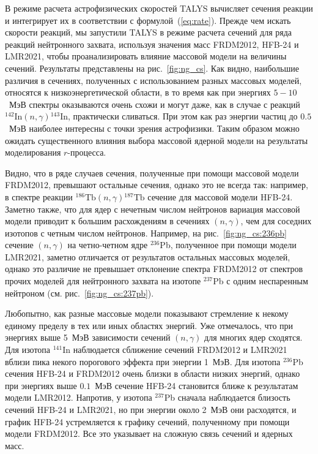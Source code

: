 В режиме расчета астрофизических скоростей TALYS вычисляет сечения реакции и интегрирует их в соответствии с формулой~(\ref{eq:rate}). Прежде чем искать скорости реакций, мы запустили TALYS в режиме расчета сечений для ряда реакций нейтронного захвата, используя значения масс FRDM2012, HFB-24 и LMR2021, чтобы проанализировать влияние массовой модели на величины сечений. Результаты представлены на рис.~\ref{fig:ng_cs}. Как видно, наибольшие различия в сечениях, полученных с использованием разных массовых моделей, относятся к низкоэнергетической области, в то время как при энергиях $5-10$~МэВ спектры оказываются очень схожи и могут даже, как в случае с реакций ${}^{142}\text{In}(n,\gamma){}^{143}\text{In}$, практически сливаться. При этом как раз энергии частиц до $0.5$~МэВ наиболее интересны с точки зрения астрофизики. Таким образом можно ожидать существенного влияния выбора массовой ядерной модели на результаты моделирования $r$-процесса.

Видно, что в ряде случаев сечения, полученные при помощи массовой модели FRDM2012, превышают остальные сечения, однако это не всегда так: например, в спектре реакции  ${}^{186}\text{Tb}(n,\gamma){}^{187}\text{Tb}$ сечение для массовой модели HFB-24. Заметно также, что для ядер с нечетным числом нейтронов вариация массовой модели приводит к большим расхождениям в сечениях $(n,\gamma)$, чем для соседних изотопов с четным числом нейтронов. Например, на рис.~\ref{fig:ng_cs:236pb} сечение $(n,\gamma)$ на четно-четном ядре ${}^{236}$Pb, полученное при помощи модели LMR2021, заметно отличается от результатов остальных массовых моделей, однако это различие не превышает отклонение спектра FRDM2012 от спектров прочих моделей для нейтронного захвата на изотопе ${}^{237}$Pb с одним неспаренным нейтроном (см. рис.~\ref{fig:ng_cs:237pb}).

Любопытно, как разные массовые модели показывают стремление к некому единому пределу в тех или иных областях энергий. Уже отмечалось, что при энергиях выше 5~МэВ зависимости сечений $(n,\gamma)$ для многих ядер сходятся. Для изотопа ${}^{141}$In наблюдается сближение сечений FRDM2012 и LMR2021 вблизи пика некого порогового эффекта при энергии 1~МэВ. Для изотопа ${}^{236}$Pb сечения HFB-24 и FRDM2012 очень близки в области низких энергий, однако при энергиях выше $0.1$~МэВ сечение HFB-24 становится ближе к результатам модели LMR2012. Напротив, у изотопа ${}^{237}$Pb сначала наблюдается близость сечений HFB-24 и LMR2021, но при энергии около 2~МэВ они расходятся, и график HFB-24 устремляется к графику сечений, полученному при помощи модели FRDM2012. Все это указывает на сложную связь сечений и ядерных масс.

